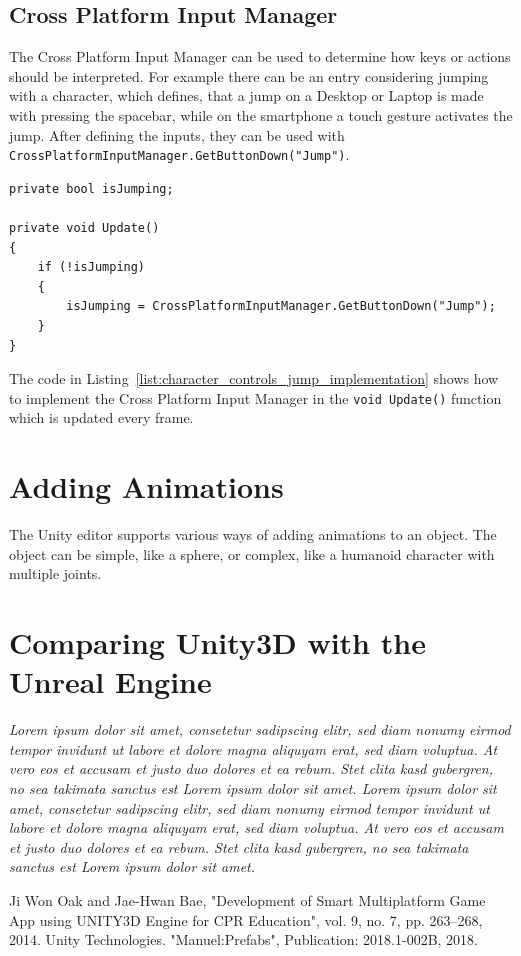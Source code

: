 \documentclass[conference]{IEEEtran}
\begin{document}
\subsection{Cross Platform Input Manager}

The Cross Platform Input Manager can be used to determine how keys or actions should be interpreted. For example there can be an entry considering jumping with a character, which defines, that a jump on a Desktop or Laptop is made with pressing the spacebar, while on the smartphone a touch gesture activates the jump. After defining the inputs, they can be used with \lstinline!CrossPlatformInputManager.GetButtonDown("Jump")!. \\

\begin{lstlisting}[caption=Example Implementation for Determining a Jump,label=list:character_controls_jump_implementation]
private bool isJumping;

private void Update()
{
	if (!isJumping)
	{
		isJumping = CrossPlatformInputManager.GetButtonDown("Jump");
	}
}
\end{lstlisting}

The code in Listing~\ref{list:character_controls_jump_implementation} shows how to implement the Cross Platform Input Manager in the \lstinline!void Update()! function which is updated every frame. 

\section{Adding Animations}

The Unity editor supports various ways of adding animations to an object. The object can be simple, like a sphere, or complex, like a humanoid character with multiple joints.

\section{Comparing Unity3D with the Unreal Engine}

\emph{Lorem ipsum dolor sit amet, consetetur sadipscing elitr, sed diam nonumy eirmod tempor invidunt ut labore et dolore magna aliquyam erat, sed diam voluptua. At vero eos et accusam et justo duo dolores et ea rebum. Stet clita kasd gubergren, no sea takimata sanctus est Lorem ipsum dolor sit amet. Lorem ipsum dolor sit amet, consetetur sadipscing elitr, sed diam nonumy eirmod tempor invidunt ut labore et dolore magna aliquyam erat, sed diam voluptua. At vero eos et accusam et justo duo dolores et ea rebum. Stet clita kasd gubergren, no sea takimata sanctus est Lorem ipsum dolor sit amet.}


\begin{thebibliography}{00}
 Ji Won Oak and Jae-Hwan Bae, "Development of Smart Multiplatform Game App using UNITY3D Engine for CPR Education", vol. 9, no. 7, pp. 263--268, 2014.
 Unity Technologies. "Manuel:Prefabs", Publication: 2018.1-002B, 2018.
\end{thebibliography}
\end{document}
